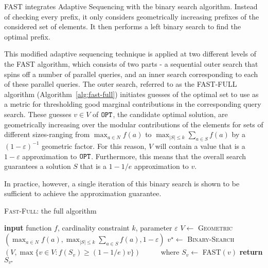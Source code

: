 \documentclass[11pt, a4paper]{article}
\begin{document}
FAST integrates Adaptive Sequencing with the binary search algorithm. Instead of checking every prefix, it only considers geometrically increasing prefixes of the considered set of elements. It then performs a left binary search to find the optimal prefix.

This modified adaptive sequencing technique is applied at two different levels of the FAST algorithm, which consists of two parts - a sequential outer search that spins off a number of parallel queries, and an inner search corresponding to each of these parallel queries. The outer search, referred to as the \textsc{FAST-FULL} algorithm (Algorithm~\ref{alg:fast-full}) initiates guesses of the optimal set to use as a metric for thresholding good marginal contributions in the corresponding query search. These guesses $v \in V$ of $\texttt{OPT}$, the candidate optimal solution, are geometrically increasing over the modular contributions of the elements for sets of different sizes-ranging from $\max_{a \in N} f(a)$ to $\max_{|S| \leq k} \sum_{a \in S} f(a)$ by a $(1 - \varepsilon)^{-1}$ geometric factor. For this reason, $V$ will contain a value that is a $1- \varepsilon$ approximation to $\texttt{OPT}$. Furthermore, this means that the overall search guarantees a solution $S$ that is a $1-1/e$ approximation to $v$.

In practice, however, a single iteration of this binary search is shown to be sufficient to achieve the approximation guarantee.

 
\begin{algorithm}[H]
\caption{\textsc{Fast-Full}: the full algorithm}
\begin{algorithmic}
    	\STATE \textbf{input} function $f$, cardinality constraint $k$, parameter $\varepsilon$
    	\STATE $V \leftarrow$ \textsc{Geometric}$(\max_{a \in N} f(a), \max_{|S| \leq k} \sum_{a \in S} f(a), 1 - \varepsilon)$
    	\STATE $v^{\star} \leftarrow$ \textsc{Binary-Search}$(V, \max\{v \in V: f(S_v) \geq (1 - 1/e)v\})$
    	\STATE \ \ \ \ \ where $S_v \leftarrow$ \textsc{FAST}$(v)$
    	\STATE \textbf{return} $S_{v^{\star}}$ 
  \end{algorithmic}
  \label{alg:fast-full}
\end{algorithm}
\end{document}
